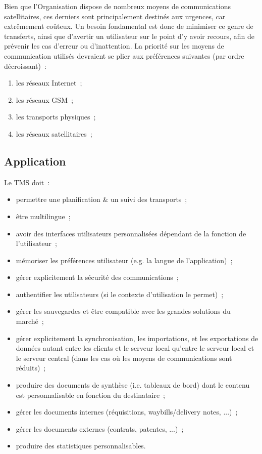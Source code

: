 \begin{constraint}
Bien que l'Organisation dispose de nombreux moyens de communications satellitaires, ces derniers sont principalement destinés aux urgences, car extrêmement coûteux. Un besoin fondamental est donc de minimiser ce genre de transferts, ainsi que d'avertir un utilisateur sur le point d'y avoir recours, afin de prévenir les cas d'erreur ou d'inattention.
La priorité sur les moyens de communication utilisés devraient se plier aux préférences suivantes (par ordre décroissant)~:
\begin{enumerate}
	\item les réseaux Internet~;
	\item les réseaux GSM~;
	\item les transports physiques~;
	\item les réseaux satellitaires~;
\end{enumerate}
\end{constraint}

\subsection{Application}
Le TMS doit~:
\begin{itemize}
	\item permettre une planification \& un suivi des transports~;
	\item être multilingue~;
	\item avoir des interfaces utilisateurs personnalisées dépendant de la fonction de l'utilisateur~;
	\item mémoriser les préférences utilisateur (e.g. la langue de l'application)~;
	\item gérer explicitement la sécurité des communications~;
	\item authentifier les utilisateurs (si le contexte d'utilisation le permet)~;
	\item gérer les sauvegardes et être compatible avec les grandes solutions du marché~;
	\item gérer explicitement la synchronisation, les importations, et les exportations de données autant entre les clients et le serveur local qu'entre le serveur local et le serveur central (dans les cas où les moyens de communications sont réduits)~;
	\item produire des documents de synthèse (i.e. tableaux de bord) dont le contenu est personnalisable en fonction du destinataire~;
	\item gérer les documents internes (réquisitions, waybills/delivery notes, ...)~;
	\item gérer les documents externes (contrats, patentes, ...)~;
	\item produire des statistiques personnalisables.
\end{itemize}

